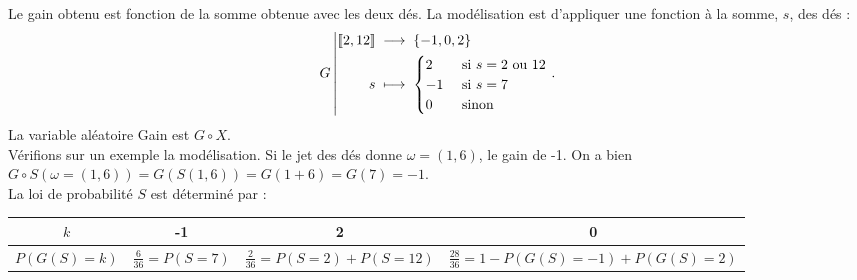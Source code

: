 \documentclass{book}
\begin{document}
\begin{Exemple}[Jeu]
Le gain obtenu est fonction de la somme obtenue avec les deux dés. La modélisation est d'appliquer une fonction à la somme, $s$, des dés  : 
 \[ {G}\left|\begin{aligned}{\mathopen\lbrack\!\lbrack2,12 \mathclose\rbrack\!\rbrack}&\;\longrightarrow\;{\{-1,0,2\}}\\{s}&\;\longmapsto\;{\begin{cases}2&\text{ si }s=2 \text{ ou } 12\\-1&\text{ si }s=7\\0 &\text{ sinon} \end{cases}}\end{aligned}\right..\]
 La variable aléatoire Gain est $G\circ X$.\\ 
Vérifions sur un exemple la modélisation. Si le jet des dés donne $\omega=(1,6)$, le gain de -1.
 On a bien $G\circ S(\omega=(1,6))=G(S(1,6))=G(1+6)=G(7)=-1$.\\
La loi de probabilité $S$ est déterminé par :
\begin{center}
\begin{tabular}{|c||c|c|c|}
\hline
$k$ & -1 &  2&0\\\hline
$P(G(S)=k)$ & $\frac{6}{36}=P(S=7)$ & $\frac{2}{36}=P(S=2)+P(S=12)$& $\frac{28}{36}=1-P(G(S)=-1)+P(G(S)=2)$  \\\hline
\end{tabular}
\end{center} 
\end{Exemple}

%
\end{document}
